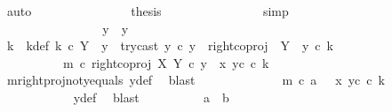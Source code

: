 \begin{isabellebody}
\ auto\isanewline
\ \ \ \ \ \ \ \ \ \ \ \ \isamarkupfalse%
\ \isamarkupfalse%
\ {\isacharquery}{\kern0pt}thesis\isanewline
\ \ \ \ \ \ \ \ \ \ \ \ \ \ \isamarkupfalse%
\ simp\isanewline
\ \ \ \ \ \ \ \ \ \ \isamarkupfalse%
\isanewline
\ \ \ \ \ \ \ \ \isamarkupfalse%
\isanewline
\ \ \ \ \ \ \isamarkupfalse%
\isanewline
\ \ \ \ \ \ \ \ \isamarkupfalse%
\ {\isachardoublequoteopen}y\ {\isasymnoteq}\ y{}{\isachardoublequoteclose}\isanewline
\ \ \ \ \ \ \ \ \isamarkupfalse%
\ \isamarkupfalse%
\ k\ \ k{\isacharunderscore}{\kern0pt}def{\isacharcolon}{\kern0pt}\ {\isachardoublequoteopen}k\ {\isasymin}\isactrlsub c\ Y\ {\isasymsetminus}\ {\isacharparenleft}{\kern0pt}{\isasymone}{\isacharcomma}{\kern0pt}y{}{\isacharparenright}{\kern0pt}\ {\isasymand}\ try{\isacharunderscore}{\kern0pt}cast\ y{}\ {\isasymcirc}\isactrlsub c\ y\ {\isacharequal}{\kern0pt}\ right{\isacharunderscore}{\kern0pt}coproj\ {\isasymone}\ {\isacharparenleft}{\kern0pt}Y\ {\isasymsetminus}\ {\isacharparenleft}{\kern0pt}{\isasymone}{\isacharcomma}{\kern0pt}y{}{\isacharparenright}{\kern0pt}{\isacharparenright}{\kern0pt}\ {\isasymcirc}\isactrlsub c\ k\ {\isasymand}\ \isanewline
\ \ \ \ \ \ \ \ \ \ m\ {\isasymcirc}\isactrlsub c\ right{\isacharunderscore}{\kern0pt}coproj\ X\ Y\ {\isasymcirc}\isactrlsub c\ y\ {\isacharequal}{\kern0pt}\ {\isasymlangle}x{}{\isacharcomma}{\kern0pt}\ y{}\isactrlsup c\ {\isasymcirc}\isactrlsub c\ k{\isasymrangle}{\isachardoublequoteclose}\isanewline
\ \ \ \ \ \ \ \ \ \ \isamarkupfalse%
\ m{\isacharunderscore}{\kern0pt}rightproj{\isacharunderscore}{\kern0pt}not{\isacharunderscore}{\kern0pt}y{}{\isacharunderscore}{\kern0pt}equals\ y{\isacharunderscore}{\kern0pt}def\ \isamarkupfalse%
\ blast\ \ \isanewline
\ \ \ \ \ \ \ \ \isamarkupfalse%
\ \isamarkupfalse%
\ {\isachardoublequoteopen}m\ {\isasymcirc}\isactrlsub c\ a\ \ {\isacharequal}{\kern0pt}\ {\isasymlangle}x{}{\isacharcomma}{\kern0pt}\ y{}\isactrlsup c\ {\isasymcirc}\isactrlsub c\ k{\isasymrangle}{\isachardoublequoteclose}\isanewline
\ \ \ \ \ \ \ \ \ \ \isamarkupfalse%
\ y{\isacharunderscore}{\kern0pt}def\ \isamarkupfalse%
\ blast\isanewline
\ \ \ \ \ \ \ \ \isamarkupfalse%
\ {\isachardoublequoteopen}a\ {\isacharequal}{\kern0pt}\ b{\isachardoublequoteclose}\isanewline

\end{isabellebody}
